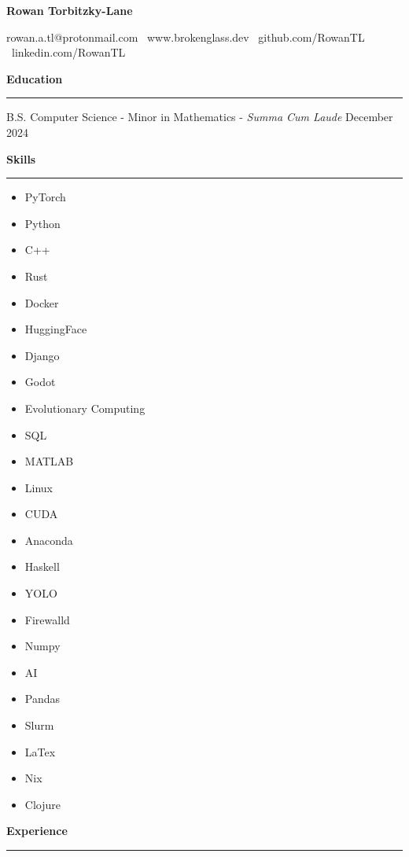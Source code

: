\documentclass[11pt]{article}
\begin{document}
\begin{center}
    \textbf{\huge Rowan Torbitzky-Lane}\\
    \hrulefill
\end{center}

\begin{center}
    rowan.a.tl@protonmail.com \textbullet \ www.brokenglass.dev \textbullet \ github.com/RowanTL \textbullet  \ linkedin.com/RowanTL
\end{center}

\textbf{Education}\par
\vspace{-12pt}
\noindent\rule{\textwidth}{0.4pt}

B.S. Computer Science - Minor in Mathematics - \textit{Summa Cum Laude} \hfill December 2024

\textbf{Skills}\par
\vspace{-12pt}
\noindent\rule{\textwidth}{0.4pt}
\vspace{-24pt}  %
\begin{multicols}{3}
    \begin{itemize}[noitemsep, topsep=0pt, partopsep=0pt, parsep=0pt, itemsep=0pt]
        \small
        \item PyTorch
        \item Python
        \item C++
        \item Rust
        \item Docker
        \item HuggingFace
        \item Django
        \item Godot
        \item Evolutionary Computing
        \item SQL
        \item MATLAB
        \item Linux
        \item CUDA
        \item Anaconda
        \item Haskell
        \item YOLO
        \item Firewalld
        \item Numpy
        \item AI
        \item Pandas
        \item Slurm
        \item LaTex
        \item Nix
        \item Clojure
    \end{itemize}
\end{multicols}
\vspace{-10pt}  %
\textbf{Experience}\par
\vspace{-12pt}
\noindent\rule{\textwidth}{0.4pt}
\end{document}
